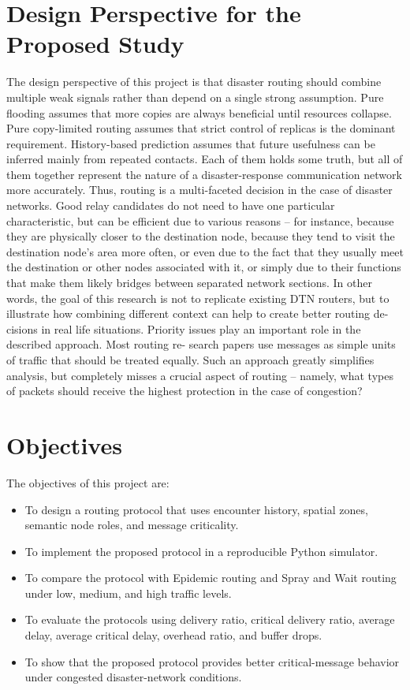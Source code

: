 \section{Design Perspective for the Proposed Study}
The design perspective of this project is that disaster routing should combine multiple weak signals rather than depend on a single strong assumption. Pure flooding assumes that more copies are always beneficial until resources collapse. Pure copy-limited routing assumes that strict control of replicas is the dominant requirement. History-based prediction assumes that future usefulness can be inferred mainly from repeated contacts. Each of them holds some truth, but all of them together represent the nature of a
disaster-response communication network more accurately.
Thus, routing is a multi-faceted decision in the case of disaster networks. Good
relay candidates do not need to have one particular characteristic, but can be efficient due
to various reasons – for instance, because they are physically closer to the destination
node, because they tend to visit the destination node’s area more often, or even due to
the fact that they usually meet the destination or other nodes associated with it, or
simply due to their functions that make them likely bridges between separated network
sections. In other words, the goal of this research is not to replicate existing DTN routers,
but to illustrate how combining different context can help to create better routing de-
cisions in real life situations.
Priority issues play an important role in the described approach. Most routing re-
search papers use messages as simple units of traffic that should be treated equally.
Such an approach greatly simplifies analysis, but completely misses a crucial aspect of
routing – namely, what types of packets should receive the highest protection in the
case of congestion?

\section{Objectives}
The objectives of this project are:

\begin{itemize}
	\item To design a routing protocol that uses encounter history, spatial zones, semantic node roles, and message criticality.
	\item To implement the proposed protocol in a reproducible Python simulator.
	\item To compare the protocol with Epidemic routing and Spray and Wait routing under low, medium, and high traffic levels.
	\item To evaluate the protocols using delivery ratio, critical delivery ratio, average delay, average critical delay, overhead ratio, and buffer drops.
	\item To show that the proposed protocol provides better critical-message behavior under congested disaster-network conditions.
\end{itemize}

